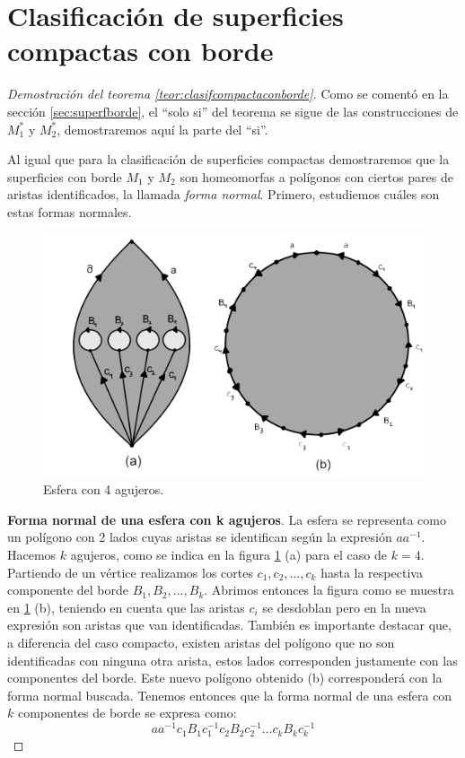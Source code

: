 \documentclass[a4paper,11pt,spanish, twoside, leqno]{tfg-uam}
\theoremstyle{definition}
\begin{document}
\section{Clasificación de superficies compactas con borde}
\label{anexo:teor1}
\begin{proof}[Demostración del teorema \ref{teor:clasifcompactaconborde}]
Como se comentó en la sección \ref{sec:superfborde}, el ``solo si'' del teorema se sigue de las construcciones de $M_1^*$ y $M_2^*$, demostraremos aquí la parte del ``si''.

Al igual que para la clasificación de superficies compactas demostraremos que la superficies con borde $M_1$ y $M_2$ son homeomorfas a polígonos con ciertos pares de aristas identificados, la llamada \textit{forma normal}. Primero, estudiemos cuáles son estas formas normales.

\begin{figure}[h!]
	\centering
	\includegraphics[width=0.5\linewidth]{imagenes/esfera4agujeros.png}
	\caption{Esfera con 4 agujeros.}
    \label{imagen de forma normal de esfera con 4 agujeros}
\end{figure}

\noindent \textbf{Forma normal de una esfera con k agujeros}. La esfera se representa como un polígono con 2 lados cuyas aristas se identifican según la expresión $aa^{-1}$. Hacemos $k$ agujeros, como se indica en la figura \ref{imagen de forma normal de esfera con 4 agujeros} (a) para el caso de $k=4$. Partiendo de un vértice realizamos los cortes $c_1, c_2, \ldots, c_k$ hasta la respectiva componente del borde $B_1, B_2, \ldots, B_k$. Abrimos entonces la figura como se muestra en \ref{imagen de forma normal de esfera con 4 agujeros} (b), teniendo en cuenta que las aristas $c_i$ se desdoblan pero en la nueva expresión son aristas que van identificadas. También es importante destacar que, a diferencia del caso compacto, existen aristas del polígono que no son identificadas con ninguna otra arista, estos lados corresponden justamente con las componentes del borde. Este nuevo polígono obtenido (b) corresponderá con la forma normal buscada. Tenemos entonces que la forma normal de una esfera con $k$ componentes de borde se expresa como:
\[ aa^{-1}c_1B_1c_1^{-1}c_2B_2c_2^{-1}\ldots c_kB_kc_k^{-1} \]


\end{proof}
\end{document}
